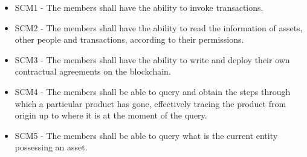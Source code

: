 		\begin{itemize}
			\item SCM1 - The members shall have the ability to invoke transactions.
			\item SCM2 - The members shall have the ability to read the information of assets, other people and transactions, according to their permissions.
			\item SCM3 - The members shall have the ability to write and deploy their own contractual agreements on the blockchain. %
        
			\item SCM4 - The members shall be able to query and obtain the steps through which a particular product has gone, effectively tracing the product from origin up to where it is at the moment of the query.%
			\item SCM5 - The members shall be able to query what is the current entity possessing an asset.


\end{itemize}
